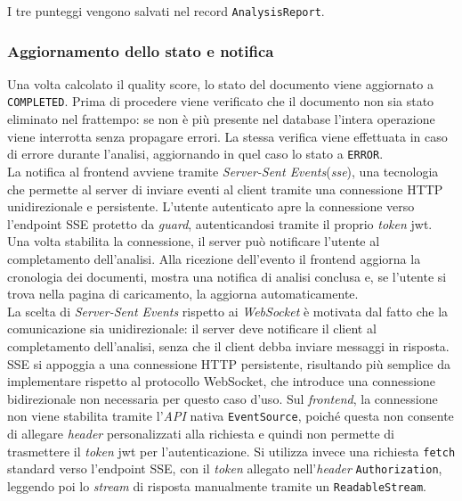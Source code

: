 I tre punteggi vengono salvati nel record \texttt{AnalysisReport}.

\subsubsection{Aggiornamento dello stato e notifica}
\label{subsection:notifica}
Una volta calcolato il quality score, lo stato del documento viene aggiornato a \texttt{COMPLETED}. Prima di procedere viene verificato che il documento non sia stato eliminato nel frattempo: se non è più presente nel database l'intera operazione viene interrotta senza propagare errori. La stessa verifica viene effettuata in caso di errore durante l'analisi, aggiornando in quel caso lo stato a \texttt{ERROR}.\\

La notifica al frontend avviene tramite \emph{Server-Sent Events}(\emph{\gls{sse}\glsfirstoccur}), una tecnologia che permette al server di inviare eventi al client tramite una connessione HTTP unidirezionale e persistente. L'utente autenticato apre la connessione verso l'endpoint SSE protetto da \emph{guard}, autenticandosi tramite il proprio \emph{token} \gls{jwt}. Una volta stabilita la connessione, il server può notificare l'utente al completamento dell'analisi. Alla ricezione dell'evento il frontend aggiorna la cronologia dei documenti, mostra una notifica di analisi conclusa e, se l'utente si trova nella pagina di caricamento, la aggiorna automaticamente.\\

La scelta di \emph{Server-Sent Events} rispetto ai \emph{WebSocket} è motivata dal fatto che la comunicazione sia unidirezionale: il server deve notificare il client al completamento dell'analisi, senza che il client debba inviare messaggi in risposta. SSE si appoggia a una connessione HTTP persistente, risultando più semplice da implementare rispetto al protocollo WebSocket, che introduce una connessione bidirezionale non necessaria per questo caso d'uso. Sul \emph{frontend}, la connessione non viene stabilita tramite l'\emph{API} nativa \texttt{EventSource}, poiché questa non consente di allegare \emph{header} personalizzati alla richiesta e quindi non permette di trasmettere il \emph{token} \gls{jwt} per l'autenticazione. Si utilizza invece una richiesta \texttt{fetch} standard verso l'endpoint SSE, con il \emph{token} allegato nell'\emph{header} \texttt{Authorization}, leggendo poi lo \emph{stream} di risposta manualmente tramite un \texttt{ReadableStream}.

